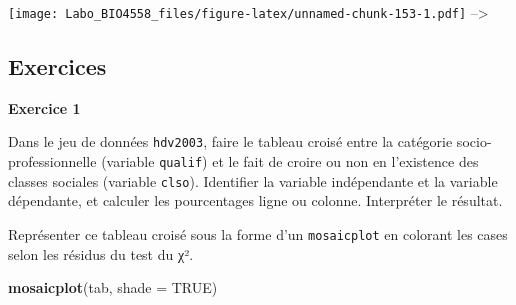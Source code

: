 \documentclass[12pt,]{book}
\newenvironment{Shaded}{\begin{snugshade}}{\end{snugshade}}
\newcommand{\CommentTok}[1]{\textcolor[rgb]{0.37,0.37,0.37}{\textit{#1}}}
\newcommand{\DataTypeTok}[1]{\textcolor[rgb]{0.27,0.27,0.27}{#1}}
\newcommand{\KeywordTok}[1]{\textcolor[rgb]{0.27,0.27,0.27}{\textbf{#1}}}
\newcommand{\NormalTok}[1]{#1}
\newcommand{\OperatorTok}[1]{\textcolor[rgb]{0.43,0.43,0.43}{\textbf{#1}}}
\newcommand{\OtherTok}[1]{\textcolor[rgb]{0.37,0.37,0.37}{#1}}
\newcommand{\StringTok}[1]{\textcolor[rgb]{0.5,0.5,0.5}{#1}}
\begin{document}
\texttt{[image: Labo\_BIO4558\_files/figure-latex/unnamed-chunk-153-1.pdf]}
--\textgreater{}

\hypertarget{ex-introR-biv}{%
\subsection{Exercices}\label{ex-introR-biv}}

\textbf{Exercice 1}

Dans le jeu de données \texttt{hdv2003}, faire le tableau croisé entre la catégorie socio-professionnelle (variable \texttt{qualif}) et le fait de croire ou non en l'existence des classes sociales (variable \texttt{clso}). Identifier la variable indépendante et la variable dépendante, et calculer les pourcentages ligne ou colonne. Interpréter le résultat.

Représenter ce tableau croisé sous la forme d'un \texttt{mosaicplot} en colorant les cases selon les résidus du test du χ².

\iffalse

\begin{solution}

\begin{Shaded}
\begin{Highlighting}[]
\KeywordTok{mosaicplot}\NormalTok{(tab, }\DataTypeTok{shade =} \OtherTok{TRUE}\NormalTok{)}
\end{Highlighting}
\end{Shaded}

\end{solution}
\end{document}
